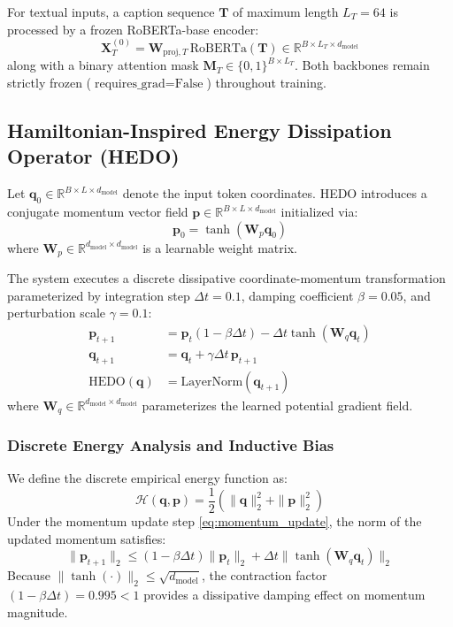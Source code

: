 \documentclass[journal]{IEEEtran}
\begin{document}
For textual inputs, a caption sequence $\mathbf{T}$ of maximum length $L_T = 64$ is processed by a frozen RoBERTa-base encoder:
\begin{equation}
\mathbf{X}_T^{(0)} = \mathbf{W}_{\text{proj}, T} \, \text{RoBERTa}(\mathbf{T}) \in \mathbb{R}^{B \times L_T \times d_{\text{model}}}
\end{equation}
along with a binary attention mask $\mathbf{M}_T \in \{0, 1\}^{B \times L_T}$. Both backbones remain strictly frozen ($\text{requires\_grad} = \text{False}$) throughout training.

\subsection{Hamiltonian-Inspired Energy Dissipation Operator (HEDO)}
Let $\mathbf{q}_0 \in \mathbb{R}^{B \times L \times d_{\text{model}}}$ denote the input token coordinates. HEDO introduces a conjugate momentum vector field $\mathbf{p} \in \mathbb{R}^{B \times L \times d_{\text{model}}}$ initialized via:
\begin{equation}
\mathbf{p}_0 = \tanh(\mathbf{W}_p \mathbf{q}_0)
\end{equation}
where $\mathbf{W}_p \in \mathbb{R}^{d_{\text{model}} \times d_{\text{model}}}$ is a learnable weight matrix.

The system executes a discrete dissipative coordinate-momentum transformation parameterized by integration step $\Delta t = 0.1$, damping coefficient $\beta = 0.05$, and perturbation scale $\gamma = 0.1$:
\begin{align}
\mathbf{p}_{t+1} &= \mathbf{p}_t (1 - \beta \Delta t) - \Delta t \tanh(\mathbf{W}_q \mathbf{q}_t) \label{eq:momentum_update} \\
\mathbf{q}_{t+1} &= \mathbf{q}_t + \gamma \Delta t \, \mathbf{p}_{t+1} \label{eq:coordinate_update} \\
\text{HEDO}(\mathbf{q}) &= \text{LayerNorm}(\mathbf{q}_{t+1}) \label{eq:hedo_output}
\end{align}
where $\mathbf{W}_q \in \mathbb{R}^{d_{\text{model}} \times d_{\text{model}}}$ parameterizes the learned potential gradient field.

\subsubsection{Discrete Energy Analysis and Inductive Bias}
We define the discrete empirical energy function as:
\begin{equation}
\mathcal{H}(\mathbf{q}, \mathbf{p}) = \frac{1}{2} \left( \|\mathbf{q}\|_2^2 + \|\mathbf{p}\|_2^2 \right)
\end{equation}
Under the momentum update step \eqref{eq:momentum_update}, the norm of the updated momentum satisfies:
\begin{equation}
\|\mathbf{p}_{t+1}\|_2 \le (1 - \beta \Delta t)\|\mathbf{p}_t\|_2 + \Delta t \|\tanh(\mathbf{W}_q \mathbf{q}_t)\|_2
\end{equation}
Because $\|\tanh(\cdot)\|_2 \le \sqrt{d_{\text{model}}}$, the contraction factor $(1 - \beta \Delta t) = 0.995 < 1$ provides a dissipative damping effect on momentum magnitude.
\end{document}
